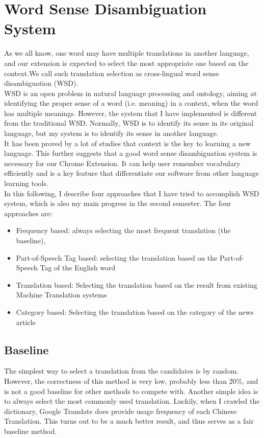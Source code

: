 \section{Word Sense Disambiguation System}
As we all know, one word may have multiple translations in another language, and our extension is expected to select the most appropriate one based on the context.We call such translation selection as cross-lingual word sense disambiguation (WSD).
\\
WSD is an open problem in natural language processing and ontology, aiming at identifying the proper sense of a word (i.e. meaning) in a context, when the word has multiple meanings. However, the system that I have implemented is  different from the traditional WSD. Normally, WSD is to identify its sense in its original language, but my system is to identify its sense in another language.
\\
It has been proved by a lot of studies that context is the key to learning a new language. This further suggests that a good word sense disambiguation system is necessary for our Chrome Extension. It can help user remember vocabulary efficiently and is a key feature that differentiate our software from other language learning tools.
\\
In this following, I describe four approaches that I have tried to accomplish WSD system, which is also my main progress in the second semester. The four approaches are: 
\begin{itemize}
\item Frequency based: always selecting the most frequent translation (the baseline),
\item Part-of-Speech Tag based: selecting the translation based on the Part-of-Speech Tag of the English word
\item Translation based: Selecting the translation based on the result from existing Machine Translation systems
\item Category based: Selecting the translation based on the category of the news article
\end{itemize}

\subsection{Baseline}
The simplest way to select a translation from the candidates is by random. However, the correctness of this method is very low, probably less than 20\%, and is not a good baseline for other methods to compete with. Another simple idea is to always select the most commonly used translation. Luckily, when I crawled the dictionary, Google Translate does provide usage frequency of each Chinese Translation.  This turns out to be a much better result, and thus serves as a fair baseline method.
\\
